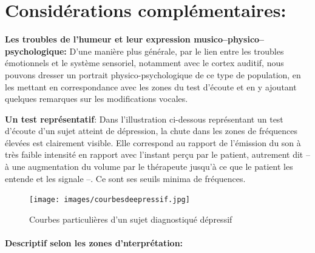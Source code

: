   
     







 




   
      \section{Considérations complémentaires:}

   
 \textbf{Les troubles de l'humeur et leur expression
    musico--physico--psychologique:}
  D'une manière plus générale, par le lien entre les troubles
 émotionnels et le
système sensoriel, notamment avec le cortex auditif, nous
pouvons dresser un portrait
physico-psychologique de ce type de population, 
  en les mettant en correspondance avec les zones du test d'écoute et
  en y ajoutant quelques remarques sur les modifications vocales.

  \textbf{Un test représentatif}: 
Dans l'illustration ci-dessous représentant un test
d'écoute d'un sujet atteint de dépression, la
chute dans les zones de fréquences élevées est
clairement visible. Elle correspond au rapport de l'émission du son à
très faible intensité en rapport avec
l'instant perçu par le
patient, autrement dit  -- à une augmentation
du volume 
par le thérapeute jusqu'à ce que le patient les entende et les signale
--.
Ce sont ses seuils minima de fréquences.
 \begin{figure}[ht]
	\centering
	\texttt{[image: images/courbesdeepressif.jpg]}
	\caption{Courbes particulières d'un sujet diagnostiqué dépressif}
	\label{fig:courbes du dépressif}
      \end{figure}




      \paragraph{Descriptif selon les zones d'nterprétation:}

